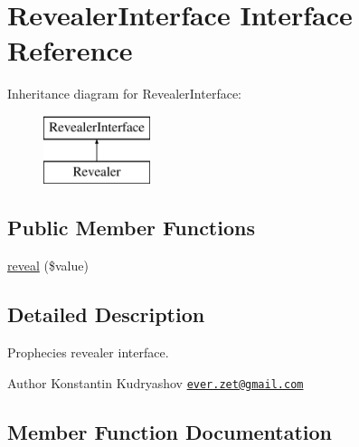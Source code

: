 \hypertarget{interface_prophecy_1_1_prophecy_1_1_revealer_interface}{}\section{Revealer\+Interface Interface Reference}
\label{interface_prophecy_1_1_prophecy_1_1_revealer_interface}
Inheritance diagram for Revealer\+Interface\+:\begin{figure}[H]
\begin{center}
\leavevmode
\includegraphics[height=2.000000cm]{interface_prophecy_1_1_prophecy_1_1_revealer_interface}
\end{center}
\end{figure}
\subsection*{Public Member Functions}
\begin{DoxyCompactItemize}
\item 
\mbox{\hyperlink{interface_prophecy_1_1_prophecy_1_1_revealer_interface_a2164ede43027e2eff4dc1419222839f5}{reveal}} (\$value)
\end{DoxyCompactItemize}


\subsection{Detailed Description}
Prophecies revealer interface.

\begin{DoxyAuthor}{Author}
Konstantin Kudryashov \href{mailto:ever.zet@gmail.com}{\tt ever.\+zet@gmail.\+com} 
\end{DoxyAuthor}


\subsection{Member Function Documentation}
\mbox{\label{interface_prophecy_1_1_prophecy_1_1_revealer_interface_a2164ede43027e2eff4dc1419222839f5}} 
